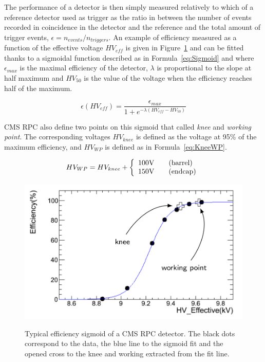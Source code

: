 	The performance of a detector is then simply measured relatively to which of a reference detector used as trigger as the ratio in between the number of events recorded in coincidence in the detector and the reference and the total amount of trigger events, $\epsilon = n_{events}/n_{triggers}$. An example of efficiency measured as a function of the effective voltage $HV_{eff}$ is given in Figure~\ref{fig:Sigmoid} and can be fitted thanks to a sigmoidal function described as in Formula~\ref{eq:Sigmoid} and where $\epsilon_{max}$ is the maximal efficiency of the detector, $\lambda$ is proportional to the slope at half maximum and $HV_{50}$ is the value of the voltage when the efficiency reaches half of the maximum.
	
	\begin{equation}
	\label{eq:Sigmoid}
	\epsilon(HV_{eff}) = \frac{\epsilon_{max}}{1+e^{-\lambda(HV_{eff}-HV_{50})}}
	\end{equation}
	
	CMS RPC also define two points on this sigmoid that called \textit{knee} and \textit{working point}. The corresponding voltages $HV_{knee}$ is defined as the voltage at 95\% of the maximum efficiency, and $HV_{WP}$ is defined as in Formula~\ref{eq:KneeWP}.
	
	\begin{equation}
	\label{eq:KneeWP}
	HV_{WP} = HV_{knee} + \left\{\begin{array}{l l}100\mathrm{V} & \quad \mathrm{(barrel)}\\ 150\mathrm{V} & \quad \mathrm{(endcap)}\\ \end{array}\right.
	\end{equation}
	
	\begin{figure}[H]
		\centering
		\includegraphics[width = 0.7\plotwidth]{fig/chapt4/Eff_sigmoid.png}\\
		\caption{\label{fig:Sigmoid} Typical efficiency sigmoid of a CMS RPC detector. The black dots correspond to the data, the blue line to the sigmoid fit and the opened cross to the knee and working extracted from the fit line.}
	\end{figure}
	
